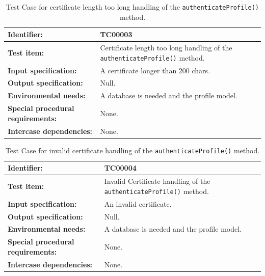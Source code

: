 \begin{table}[H]
	\centering
		\begin{tabular}{| p{4.5cm} | m{9cm} |}
			\hline
			\textbf{Identifier:} 					& TC00003 \\ \hline
			\textbf{Test item:}						& Certificate length too long handling of the \texttt{authenticateProfile()} method. \\ \hline
			\textbf{Input specification:}			& A certificate longer than 200 chars. \\ \hline
			\textbf{Output specification:} 			& Null. \\ \hline
			\textbf{Environmental needs:}			& A database is needed and the profile model. \\ \hline
			\textbf{Special procedural requirements:}	& None. \\ \hline
			\textbf{Intercase dependencies:}			& None. \\ \hline
		\end{tabular}
	\caption{Test Case for certificate length too long handling of the \texttt{authenticateProfile()} method.}
	\label{tab:TestCase_CertificateToLongHandling}
\end{table}

\begin{table}[H]
	\centering
		\begin{tabular}{| p{4.5cm} | m{9cm} |}
			\hline
			\textbf{Identifier:} 					& TC00004 \\ \hline
			\textbf{Test item:}						& Invalid Certificate handling of the \texttt{authenticateProfile()} method. \\ \hline
			\textbf{Input specification:}			& An invalid certificate. \\ \hline
			\textbf{Output specification:} 			& Null. \\ \hline
			\textbf{Environmental needs:}			& A database is needed and the profile model. \\ \hline
			\textbf{Special procedural requirements:}	& None. \\ \hline
			\textbf{Intercase dependencies:}			& None. \\ \hline
		\end{tabular}
	\caption{Test Case for invalid certificate handling of the \texttt{authenticateProfile()} method.}
	\label{tab:TestCase_InvalidCertificateHandling}
\end{table}

